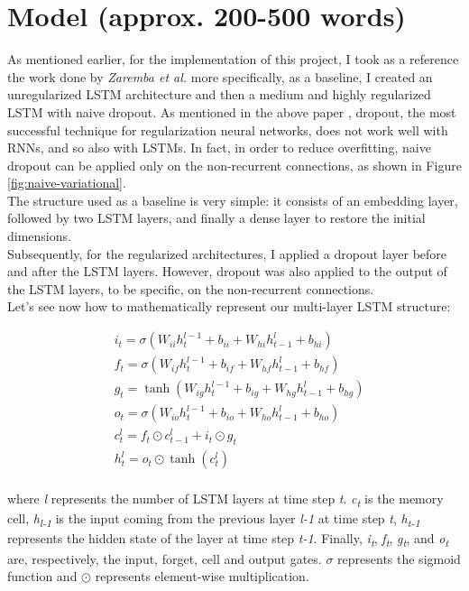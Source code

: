 \documentclass[a4paper]{article}
\begin{document}
\section{Model (approx. 200-500 words)}
As mentioned earlier, for the implementation of this project, I took as a reference the work done by \textit{Zaremba et al.} \cite{zaremba-rnn} more specifically, as a baseline, I created an unregularized LSTM architecture and then a medium and highly regularized LSTM with naive dropout. As mentioned in the above paper \cite{zaremba-rnn}, dropout, the most successful technique for regularization neural networks, does not work well with RNNs, and so also with LSTMs. In fact, in order to reduce overfitting, naive dropout can be applied only on the non-recurrent connections, as shown in Figure \ref{fig:naive-variational}.
\\
The structure used as a baseline is very simple: it consists of an embedding layer, followed by two LSTM layers, and finally a dense layer to restore the initial dimensions.
\\
Subsequently, for the regularized architectures, I applied a dropout layer before and after the LSTM layers. However, dropout was also applied to the output of the LSTM layers, to be specific, on the non-recurrent connections.
\\
Let's see now how to mathematically represent our multi-layer LSTM structure:

\begin{equation}
\begin{align*}
&i_t = \sigma(W_{ii}h_{t}^{l-1} + b_{ii} + W_{hi}h_{t-1}^{l} + b_{hi})\\
&f_t = \sigma(W_{if}h_{t}^{l-1} + b_{if} + W_{hf}h_{t-1}^{l} + b_{hf})\\
&g_t = \tanh(W_{ig}h_{t}^{l-1} + b_{ig} + W_{hg}h_{t-1}^{l} + b_{hg})\\
&o_t = \sigma(W_{io}h_{t}^{l-1} + b_{io} + W_{ho}h_{t-1}^{l} + b_{ho})\\
&c_t^l = f_{t} \odot c_{t-1}^{l} + i_t \odot g_t\\
&h_t^l = o_t \odot \tanh(c_t^l)\\
\end{align*}
\label{lstm_structure}
\end{equation}

where \textit{l} represents the number of LSTM layers at time step \textit{t}. \textit{c\textsubscript{t}}  is the memory cell, \textit{h\textsubscript{l-1}} is the input coming from the previous layer \textit{l-1} at time step \textit{t}, \textit{h\textsubscript{t-1}} represents the hidden state of the layer at time step \textit{t-1}. Finally, \textit{i\textsubscript{t}}, \textit{f\textsubscript{t}}, \textit{g\textsubscript{t}}, and \textit{o\textsubscript{t}} are, respectively, the input, forget, cell and output gates. $\sigma$  represents the sigmoid function and $\odot$ represents element-wise multiplication.
    
\end{document}
